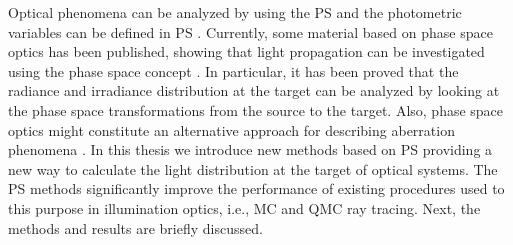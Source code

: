 Optical phenomena can be analyzed by using the PS and the photometric variables can be defined in PS \cite{rausch2014illumination}.  
Currently, some material based on phase space optics has been published, showing that light propagation can be investigated using the phase space concept \cite{rausch2012phase,rausch2014phase, herkommer2012phase}. 
In particular, it has been proved that the radiance and irradiance distribution at the target can be analyzed by looking at the phase space transformations from the source to the target.
Also, phase space optics might constitute an alternative approach for describing aberration phenomena \cite{herkommer2013phase, babington2017freeform, wolf1993relativistic}. In this thesis we introduce new methods based on PS providing a new way to calculate the light distribution at the target of optical systems. The PS methods significantly improve the performance of existing procedures used to this purpose in illumination optics, i.e., MC and QMC ray tracing. 
Next, the methods and results are briefly discussed. 
